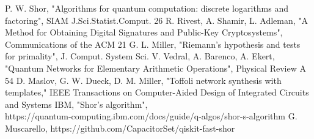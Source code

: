 \documentclass[conference]{IEEEtran}
\begin{document}
\begin{thebibliography}{00}
 P. W. Shor, "Algorithms for quantum computation: discrete logarithms and factoring", SIAM J.Sci.Statist.Comput. 26
 R. Rivest, A. Shamir, L. Adleman, "A Method for Obtaining Digital Signatures and Public-Key Cryptosystems", Communications of the ACM 21
 G. L. Miller, "Riemann's hypothesis and tests for primality", J. Comput. System Sci.
 V. Vedral, A. Barenco, A. Ekert, "Quantum Networks for Elementary Arithmetic Operations", Physical Review A 54
 D. Maslov, G. W. Dueck, D. M. Miller, "Toffoli network synthesis with templates," IEEE Transactions on Computer-Aided Design of Integrated Circuits and Systems
 IBM, "Shor's algorithm",\\https://quantum-computing.ibm.com/docs/guide/q-algos/shor-s-algorithm
 G. Muscarello, https://github.com/CapacitorSet/qiskit-fast-shor
\end{thebibliography}
\vspace{12pt}
\end{document}
